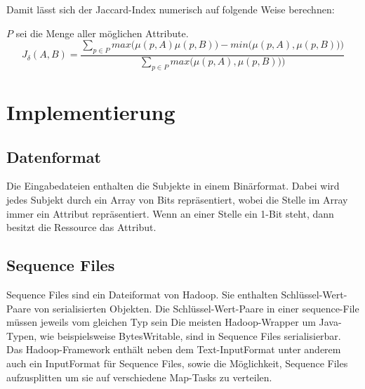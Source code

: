 \documentclass[a4paper]{llncs}
\begin{document}
Damit lässt sich der Jaccard-Index numerisch auf folgende Weise berechnen:

$P$ sei die Menge aller möglichen Attribute.
$$J_{\delta}(A,B) = \frac{\sum\limits_{p \in P}max\bigl(\mu(p, A)\mu(p, B)\bigr) - min\bigl(\mu(p, A),\mu(p, B))\bigr)}{\sum\limits_{p \in P}max\bigl(\mu(p, A),\mu(p, B))\bigr)}$$

\section{Implementierung}

\subsection{Datenformat}
Die Eingabedateien enthalten die Subjekte in einem Binärformat. Dabei wird jedes Subjekt durch ein Array von Bits repräsentiert, wobei die Stelle im Array immer ein Attribut repräsentiert. Wenn an einer Stelle ein 1-Bit steht, dann besitzt die Ressource das Attribut.

\subsection{Sequence Files}
Sequence Files sind ein Dateiformat von Hadoop. Sie enthalten Schlüssel-Wert-Paare von serialisierten Objekten. Die Schlüssel-Wert-Paare in einer sequence-File müssen jeweils vom gleichen Typ sein 
Die meisten Hadoop-Wrapper um Java-Typen, wie beispielsweise BytesWritable, sind in Sequence Files serialisierbar.
Das Hadoop-Framework enthält neben dem Text-InputFormat unter anderem auch ein InputFormat für Sequence Files, sowie die Möglichkeit, Sequence Files aufzusplitten um sie auf verschiedene Map-Tasks zu verteilen.
\end{document}
